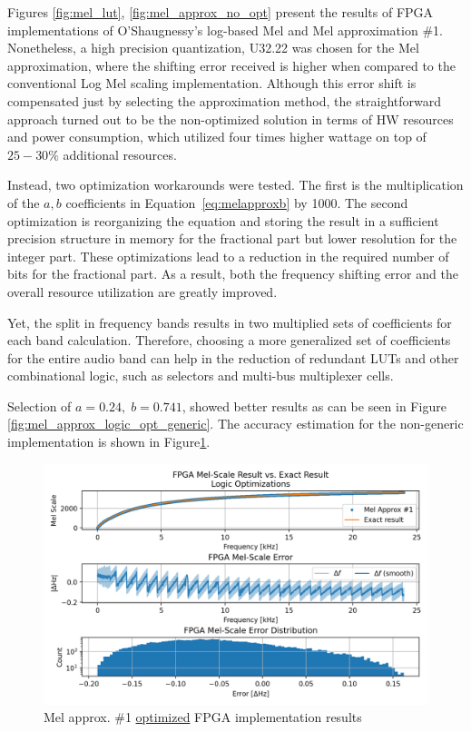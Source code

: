 Figures \ref{fig:mel_lut}, \ref{fig:mel_approx_no_opt} 
present the results of FPGA implementations
of O'Shaugnessy's log-based Mel and Mel approximation \#1.
Nonetheless, a high precision quantization, U32.22 was chosen
for the Mel approximation, where 
the shifting error received is higher when compared 
to the conventional Log Mel scaling implementation.
Although this error shift is compensated 
just by selecting the approximation method, 
the straightforward approach 
turned out to be the non-optimized solution 
in terms of HW resources and power consumption,
which utilized four times higher wattage on top of \(25 - 30 \%\) 
additional resources.

Instead, two optimization workarounds were tested.
The first is the multiplication of the \(a, b\) coefficients
in Equation~\ref{eq:melapproxb} by 1000. 
The second optimization is reorganizing the equation
and storing the result in a sufficient precision structure in memory
for the fractional part but lower resolution for the integer part.  
These optimizations lead to a reduction in the 
required number of bits for the fractional part.
As a result, both the frequency shifting error 
and the overall resource utilization are greatly improved.

Yet, the split in frequency bands results in two multiplied sets
of coefficients for each band calculation.
Therefore, choosing a more generalized set 
of coefficients for the entire audio band can help 
in the reduction of redundant LUTs and other combinational logic, 
such as selectors and multi-bus multiplexer cells.

Selection of \(a=0.24,\;b=0.741\), showed better results
as can be seen in Figure \ref{fig:mel_approx_logic_opt_generic}.
The accuracy estimation for the non-generic implementation
is shown in Figure\;\ref{fig:mel_approx_logic_opt}.

\begin{figure}[H]
    \centering
    \includegraphics[width=\linewidth]{Scaling/images/mel_approx_logic_opt}
    \caption{Mel approx. \#1 \underline{optimized} FPGA implementation results}\label{fig:mel_approx_logic_opt}
\end{figure}


